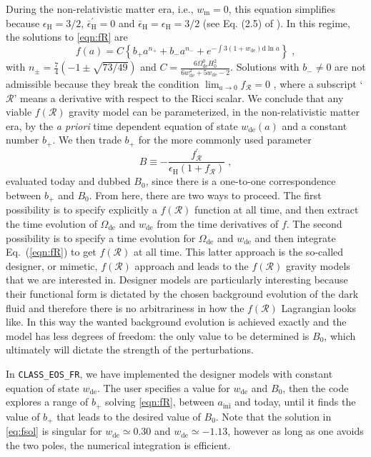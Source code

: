 \documentclass[nofootinbib,a4paper,aps,prd,10pt,superscriptaddress,reprint,showkeys,showpacs]{revtex4-1}
\newcommand{\qsubrm}[2]{{#1}_{\scriptscriptstyle{\textrm{#2}}}}
\def\be{\begin{equation}}
\def\ee{\end{equation}}
\begin{document}
During the non-relativistic matter era, i.e., $\qsubrm{w}{m}=0$, this equation simplifies because 
$\qsubrm{\epsilon}{H} = 3/2$, $\qsubrm{\bar{\epsilon}}{H}^\prime = 0$ and 
$\qsubrm{\bar{\epsilon}}{H} = \qsubrm{\epsilon}{H} = 3/2$ (see Eq. (2.5) of \citep{Battye2016a}). In this regime, the 
solutions to \eqref{eqn:fR} are
\be\label{eq:fsol}
 f(a) = C\left\{{b}_{+}a^{n_{+}}+{b}_{-}a^{n_{-}}+e^{-\int 3(1+\qsubrm{w}{de})\mathrm{d}\ln a}\right\}\;,
\ee
with $n_{\pm} = \tfrac{7}{4}(-1\pm\sqrt{73/49})$ and 
$C = \frac{6\Omega_{{\scriptscriptstyle\mathrm{de}}}^{{\scriptscriptstyle 0}}H_{0}^{2}}
{6\qsubrm{w}{de}^{2}+5\qsubrm{w}{de}-2}$. 
Solutions with ${b}_{-}\neq 0$ are not admissible because they break the condition 
$\lim_{a\rightarrow 0}f_{\mathcal{R}}=0$ \citep{Khoury2004a,Khoury2004b,Hu2007}, where a subscript `$\mathcal{R}$' 
means a derivative with respect to the Ricci scalar. We conclude that any viable $f(\mathcal{R})$ gravity model can be 
parameterized, in the non-relativistic matter era, by the \textit{a priori} time dependent equation of state 
$\qsubrm{w}{de}(a)$ and a constant number $b_+$. We then trade $b_+$ for the more commonly used parameter
\be\label{eq:bo}
 B \equiv -\frac{{f_{\mathcal{R}}^{\prime}}}{\qsubrm{\epsilon}{H}(1+f_{\mathcal{R}})}\;,
\ee
evaluated today and dubbed $\qsubrm{B}{0}$, since there is a one-to-one correspondence between $b_{+}$ and 
$\qsubrm{B}{0}$. 
From here, there are two ways to proceed. The first possibility is to specify explicitly a $f(\mathcal{R})$ function at 
all time, and then extract the time evolution of $\qsubrm{\Omega}{de}$ and $\qsubrm{w}{de}$ from the time derivatives 
of $f$. 
The second possibility is to specify a time evolution for $\qsubrm{\Omega}{de}$ and $\qsubrm{w}{de}$ and then integrate 
Eq.~(\ref{eqn:fR}) to get $f(\mathcal{R})$ at all time. This latter approach is the so-called designer, or mimetic, 
$f(\mathcal{R})$ approach and leads to the $f(\mathcal{R})$ gravity models that we are interested in. Designer models 
are particularly interesting because their functional form is dictated by the chosen background evolution of the 
dark fluid and therefore there is no arbitrariness in how the $f(\mathcal{R})$ Lagrangian looks like. In this way the 
wanted background evolution is achieved exactly and the model has less degrees of freedom: the only value to be 
determined is $\qsubrm{B}{0}$, which ultimately will dictate the strength of the perturbations.

In \verb|CLASS_EOS_FR|, we have implemented the designer models with constant equation of state $\qsubrm{w}{de}$. The 
user specifies a value for $\qsubrm{w}{de}$ and $\qsubrm{B}{0}$, then the code explores a range of $b_{+}$ solving 
\eqref{eqn:fR}, between $\qsubrm{a}{ini}$ and today, until it finds the value of $b_{+}$ that leads to the desired 
value of $\qsubrm{B}{0}$. Note that the solution in \eqref{eq:fsol} is singular for $\qsubrm{w}{de}\simeq0.30$ and 
$\qsubrm{w}{de}\simeq-1.13$, however as long as one avoids the two poles, the numerical integration is efficient.
\end{document}
